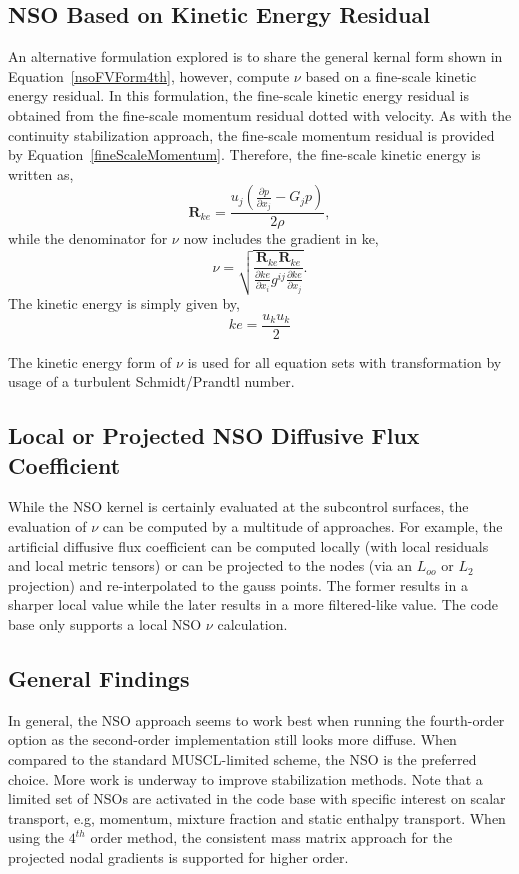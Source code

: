 \subsection{NSO Based on Kinetic Energy Residual}
An alternative formulation explored is to share the general kernal form shown in Equation~\ref{nsoFVForm4th},
however, compute $\nu$ based on a fine-scale kinetic energy residual. In this formulation, the fine-scale
kinetic energy residual is obtained from the fine-scale momentum residual dotted with velocity. As with the 
continuity stabilization approach, the fine-scale momentum residual is provided by Equation~\ref{fineScaleMomentum}.
Therefore, the fine-scale kinetic energy is written as,
\begin{equation}
 \mathbf{R}_{ke} = \frac{u_j(\frac{\partial p} {\partial x_j} - G_j p )}{2 \rho},
\label{fineScaleKe}
\end{equation}
while the denominator for $\nu$ now includes the gradient in ke,
\begin{equation}
  \nu = \sqrt{ \frac{\mathbf{R}_{ke} \mathbf{R}_{ke}} {\frac {\partial ke}{\partial x_i} g^{ij} \frac{\partial ke}{\partial x_j}} }.
\label{nuKe}
\end{equation}
The kinetic energy is simply given by,
\begin{equation}
  ke = \frac{u_k u_k}{2}
\label{keForm}
\end{equation}

The kinetic energy form of $\nu$ is used for all equation sets with transformation by usage of a 
turbulent Schmidt/Prandtl number.

\subsection{Local or Projected NSO Diffusive Flux Coefficient}
While the NSO kernel is certainly evaluated at the subcontrol surfaces, the evaluation of $\nu$ can be 
computed by a multitude of approaches. For example, the artificial diffusive flux coefficient 
can be computed locally (with local residuals and local metric tensors) or can be projected 
to the nodes (via an $L_{oo}$ or $L_2$ projection) and re-interpolated to the gauss points. 
The former results in a sharper local value while the later results in a more filtered-like value.
The code base only supports a local NSO $\nu$ calculation.

\subsection{General Findings}
In general, the NSO approach seems to work best when running the fourth-order option as the second-order 
implementation still looks more diffuse. When compared to the standard MUSCL-limited scheme, the NSO
is the preferred choice. More work is underway to improve stabilization methods.
Note that a limited set of NSOs are activated in the code base with specific
interest on scalar transport, e.g, momentum, mixture fraction and static enthalpy transport. 
When using the $4^{th}$  order method, the consistent mass matrix approach for the projected 
nodal gradients is supported for higher order.

